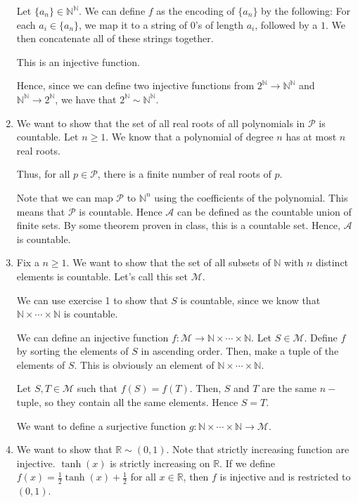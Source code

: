\documentclass[12pt]{article}
\begin{document}
\begin{enumerate}[start=1,label={\bfseries Exercise \arabic*:},leftmargin=1in]
    Let $\{ a_{n} \} \in \mathbb{N}^\mathbb{N}$. We can define $f$ as the encoding of $\{a_{n}\}$ by the following:
    For each $a_{i} \in \{ a_{n} \}$, we map it to a string of $0$'s of length $a_{i}$, followed by a $1$. 
    We then concatenate all of these strings together. 

    This is an injective function. 

    Hence, since we can define two injective functions from $2^{\mathbb{N}} \rightarrow \mathbb{N}^{\mathbb{N}}$ and $\mathbb{N}^\mathbb{N} \rightarrow 2^{\mathbb{N}}$, we have that $2^{\mathbb{N}} \sim \mathbb{N}^{\mathbb{N}}$.

    \item We want to show that the set of all real roots of all polynomials in $\mathcal{P}$ is countable. 
    Let $n \geq 1$. We know that a polynomial of degree $n$ has at most $n$ real roots.

    Thus, for all $p \in \mathcal{P}$, there is a finite number of real roots of $p$. 
    
    Note that we can map $\mathcal{P}$ to $\mathbb{N}^n$ using the coefficients of the polynomial. 
    This means that $\mathcal{P}$ is countable. Hence $\mathcal{A}$ can be defined as the countable union of finite sets. 
    By some theorem proven in class, this is a countable set. Hence, $\mathcal{A}$ is countable. 


    \item Fix a $n \geq 1$. We want to show that the set of all subsets of $\mathbb{N}$ with $n$ distinct elements is countable. 
    Let's call this set $\mathcal{M}$. 

    We can use exercise 1 to show that $S$ is countable, since we know that $\mathbb{N} \times \cdots \times \mathbb{N}$ is countable.

    We can define an injective function $f: \mathcal{M} \rightarrow \mathbb{N} \times \cdots \times \mathbb{N}$. 
    Let $S \in \mathcal{M}$. Define $f$ by sorting the elements of $S$ in ascending order. Then, make a tuple of the elements of $S$. This is obviously an element of $\mathbb{N} \times \cdots \times \mathbb{N}$.

    Let $S, T \in \mathcal{M}$ such that $f(S) = f(T)$. Then, $S$ and $T$ are the same $n-$tuple, so  
    they contain all the same elements. Hence $S = T$. 

    We want to define a surjective function $g: \mathbb{N} \times \cdots \times \mathbb{N} \rightarrow \mathcal{M}$.
    \item We want to show that $\mathbb{R} \sim (0, 1)$. 
    Note that strictly increasing function are injective. $\tanh(x)$ is strictly increasing on $\mathbb{R}$. 
    If we define $f(x) = \frac{1}{2}\tanh(x) + \frac{1}{2}$ for all $x \in \mathbb{R}$, then $f$ is injective and is restricted to $(0, 1)$. 


\end{enumerate}
\end{document}
